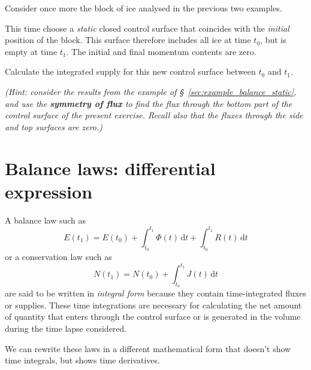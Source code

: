 \documentclass[a4paper,12pt,%
onecolumn,oneside,%
british%
]{memoir}
\newcommand*{\di}{\mathrm{d}}%
\renewcommand*{\|}[1][]{\nonscript\:#1\vert\nonscript\:\mathopen{}}
\newcommand*{\sect}{\S}%
\newcommand*{\yti}{t_{0}}
\newcommand*{\ytf}{t_{1}}
\newcommand*{\yN}{N}
\newcommand*{\yJ}{J}
\newcommand*{\yE}{E}
\newcommand*{\yH}{\varPhi}%
\newcommand*{\yR}{R}%
\begin{document}
\medskip

\begin{exercise}
  Consider once more the block of ice analysed in the previous two examples.

  This time choose a \emph{static} closed control surface that coincides with the \emph{initial} position of the block. This surface therefore includes all ice at time $\yti$, but is empty at time $\ytf$. The initial and final momentum contents are zero.

  Calculate the integrated supply for this new control surface between $\yti$ and $\ytf$.

  \emph{(Hint: consider the results from the example of \sect~\ref{sec:example_balance_static}, and use the \textbf{symmetry of flux} to find the flux through the bottom part of the control surface of the present exercise. Recall also that the fluxes through the side and top surfaces are zero.)}
\end{exercise}







\section{Balance laws: differential expression}
\label{sec:balance_laws_diff}

A balance law such as
\begin{equation*}
  \yE(\ytf) = \yE(\yti)
  + \int_{\yti}^{\ytf}\!\!\yH(t)\, \di t
  + \int_{\yti}^{\ytf}\!\!\yR(t)\,\di t
\end{equation*}
or a conservation law such as
\begin{equation*}
    \yN(\ytf) = \yN(\yti) + \int_{\yti}^{\ytf}\!\!\yJ(t)\, \di t
\end{equation*}
are said to be written in \emph{integral form} because they contain time-integrated fluxes or supplies. These time integrations are necessary for calculating the net amount of quantity that enters through the control surface or is generated in the volume during the time lapse considered.

We can rewrite these laws in a different mathematical form that doesn't show time integrals, but shows time derivatives.
\end{document}
